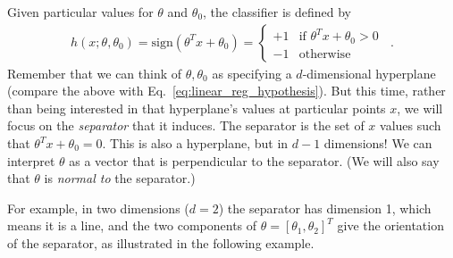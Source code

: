 Given particular values for $\theta$ and $\theta_0$, the classifier is
defined by
\begin{eqnarray*}
  h(x; \theta, \theta_0) = \text{sign}(\theta^T x + \theta_0)
  = \begin{cases} +1 & \text{if $\theta^Tx + \theta_0 > 0$} \\ -1 &
              \text{otherwise}\end{cases} \;\;.
\end{eqnarray*}
Remember that we can think of $\theta, \theta_0$ as specifying a
$d$-dimensional hyperplane (compare the above with
Eq.~\ref{eq:linear_reg_hypothesis}).  But this time, rather than
being interested in that hyperplane's values at particular points $x$,
we will focus on the {\em separator} that it induces.  The separator
is the set of $x$ values such that $\theta^T x + \theta_0 = 0$.  This
is also a hyperplane, but in $d-1$ dimensions!
We can interpret $\theta$ as a
vector that is perpendicular to the separator.  (We will also say
that $\theta$ is {\em normal to} the separator.)

For example, in two dimensions ($d=2$) the separator has dimension 1,
which means it is a line, and
the two components of $\theta = [\theta_1, \theta_2]^T$ give the orientation
of the separator, as illustrated in the following example.


